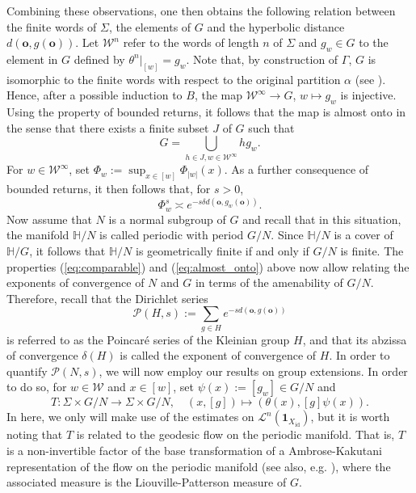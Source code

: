 \documentclass[10pt]{article}
\theoremstyle{mystyle}
\renewcommand{\H}{\mathbb{H}}
\newcommand{\cW}{\mathcal{W}}
\newcommand{\cL}{\mathcal{L}}
\newcommand{\cP}{\mathcal{P}}
\newcommand{\te}{{\theta}}
\newcommand{\Sig}{{\Sigma}}
\newcommand{\1}{\mathbf{1}}
\DeclareMathOperator{\id}{id}
\begin{document}
Combining these observations, one then obtains the following relation between the finite words  of $\Sig$, the elements of $G$ and the hyperbolic distance $d(\mathbf{o},g(\mathbf{o}))$. Let $\cW^n$ refer to the words of length $n$ of $\Sig$ and $g_w \in G$ to the element in $G$ defined by $\te^n|_{[w]} = g_w$. Note that, by construction of $\Gamma$, $G$ is isomorphic to the finite words with respect to the original partition $\alpha$ (see \cite{StadlbauerStratmann:2005}). Hence, after a possible induction to $B$, the map $\cW^\infty \to G$,  $w \mapsto g_w$ is injective. Using the property of bounded returns, it follows that the map is almost onto in the sense that there exists a finite subset $J$ of $G$ such that
\begin{equation} \label{eq:almost_onto} G = \bigcup_{h \in J,w \in \cW^\infty} hg_w.\end{equation} 
For $w \in \cW^\infty$, set $ \Phi_w:=\sup_{x \in [w]}\Phi_{|w|}(x)$. As a further consequence of bounded returns, it then follows that, for $s>0$, 
%
\begin{equation}\label{eq:comparable}
\Phi_w^s \asymp e^{-s\delta d(\mathbf{o},g_w(\mathbf{o}))}.
\end{equation}
%
Now assume that $N$ is a normal subgroup of $G$ and recall that in this situation, the manifold $\H/N$ is called periodic with period $G/N$. Since $\H/N$ is a cover of $\H/G$, it follows that $\H/N$ is  geometrically finite if and only if $G/N$ is finite.  The properties (\ref{eq:comparable}) and (\ref{eq:almost_onto}) above now allow relating the exponents of convergence of $N$ and $G$ in terms of the amenability of $G/N$. Therefore, recall that the Dirichlet series
\[
\cP(H,s) := \sum_{g \in H} e^{-s d(\mathbf{o},g(\mathbf{o}))} 
\]
is referred to as the Poincaré series of the Kleinian group $H$, and that its abzissa of convergence $\delta(H)$ is called the exponent of convergence of $H$. In order to quantify $\cP(N,s)$, we will now employ our results on group extensions. In order to do so, for $w \in \cW$ and $x \in [w]$, set $\psi(x):= [g_w] \in G/N$ and   
\[ T: \Sig\times G/N \to \Sig\times G/N, \quad (x,[g]) \mapsto  (\te(x),[g]\psi(x)).\]
In here, we only will make use of the estimates on $\cL^n(\1_{X_{\id}})$, but it is worth noting that $T$ is related to the geodesic flow on the periodic manifold. That is, $T$ is a non-invertible factor of the base transformation of a Ambrose-Kakutani representation of the flow on the periodic manifold (see also, e.g. \cite{AaronsonDenker:1999,Sarig:2004}), where the associated measure is the Liouville-Patterson measure of $G$. 
\end{document}
